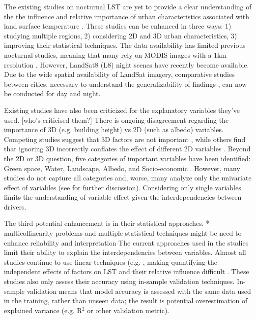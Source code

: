 \documentclass[final,3p,times,twocolumn,sort&compress]{elsarticle}
\begin{document}
The existing studies on nocturnal LST are yet to provide a clear understanding of the the influence and relative importance of urban characteristics associated with land surface temperature \cite{Chun2017-mm, Echevarria_Icaza2016-fr, Wicki2017-fv, Zhou2014-wc}. 
These studies can be enhanced in three ways: 1) studying multiple regions, 2) considering 2D and 3D urban characteristics, 3) improving their statistical techniques.
The data availability has limited previous nocturnal studies, meaning that many rely on MODIS images with a 1km resolution \cite{Zhou2014-wc, Echevarria_Icaza2016-fr,Wang2019-tree,Peng2012-iy}.
However, LandSat8 (L8) night scenes have recently become available. 
Due to the wide spatial availability of LandSat imagery, comparative studies between cities, necessary to understand the generalizability of findings \cite{Peng2012-iy, Hung2006-qy}, can now be conducted for day and night.

Existing studies have also been criticized for the explanatory variables they've used. [who's criticised them?]
There is ongoing disagreement regarding the importance of 3D (e.g. building height) vs 2D (such as albedo) variables.  
Competing studies suggest that 3D factors are not important \cite{Berger2017-lx}, while others find that ignoring 3D incorrectly conflates the effect of different 2D variables \cite{Chun2017-mm}.
Beyond the 2D or 3D question, five categories of important variables have been identified: Green space, Water, Landscape, Albedo, and Socio-economic \cite{Peng2018-cp}. 
However, many studies do not capture all categories and, worse, many analyze only the univariate effect of variables \cite{Zhao2017-cc, Merbitz2012-xz, Unger2004-ry} (see \cite{Peng2018-cp, Chun2017-mm} for further discussion). 
Considering only single variables limits the understanding of variable effect given the interdependencies between drivers.

The third potential enhancement is in their statistical approaches.
* multicollinearity problems and multiple statistical techniques might be need to enhance reliability and interpretation \cite{Zhou2014-wc}
The current approaches used in the studies limit their ability to explain the interdependencies between variables. 
Almost all studies continue to use linear techniques (e.g. \cite{Li2017-yl, Peng2012-iy, Wicki2017-fv,Zhou2014-wc,Peng2018-cp,Echevarria_Icaza2016-fr,Chun2017-mm,Chun2018-so,Wang2019-tree,Wang2019-water}, making quantifying the independent effects of factors on LST and their relative influence difficult \cite{Peng2018-cp, Zhou2014-wc}.
These studies also only assess their accuracy using in-sample validation techniques.
In-sample validation means that model accuracy is assessed with the same data used in the training, rather than unseen data; the result is potential overestimation of explained variance (e.g. R$^2$ or other validation metric).
\end{document}
